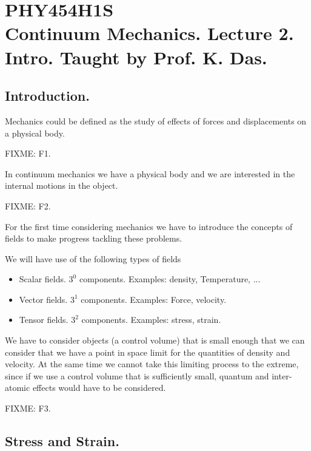 
%

\chapter{PHY454H1S\\Continuum Mechanics.  Lecture 2.  Intro.  Taught by Prof. K. Das.}
\label{chap:continuumL2}
{}
\date{Jan 13, 2012}

\beginArtWithToc

\section{Introduction.}

Mechanics could be defined as the study of effects of forces and displacements on a physical body.

FIXME: F1.

In continuum mechanics we have a physical body and we are interested in the internal motions in the object.  

FIXME: F2.

For the first time considering mechanics we have to introduce the concepts of fields to make progress tackling these problems.

We will have use of the following types of fields

\begin{itemize}
\item Scalar fields.  $3^0$ components.  Examples: density, Temperature, ...
\item Vector fields.  $3^1$ components.  Examples: Force, velocity.
\item Tensor fields.  $3^2$ components.  Examples: stress, strain.
\end{itemize}

We have to consider objects (a control volume) that is small enough that we can consider that we have a point in space limit for the quantities of density and velocity.  At the same time we cannot take this limiting process to the extreme, since if we use a control volume that is sufficiently small, quantum and inter-atomic effects would have to be considered.

FIXME: F3.

\section{Stress and Strain.}


